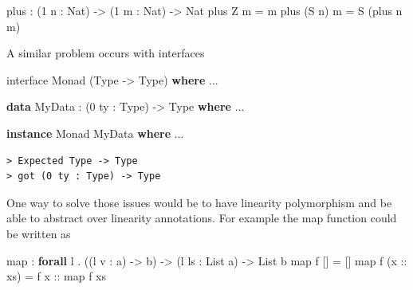 \documentclass[
]{article}
\newenvironment{Shaded}{}{}
\newcommand{\DataTypeTok}[1]{\textcolor[rgb]{0.56,0.13,0.00}{#1}}
\newcommand{\DecValTok}[1]{\textcolor[rgb]{0.25,0.63,0.44}{#1}}
\newcommand{\FunctionTok}[1]{\textcolor[rgb]{0.02,0.16,0.49}{#1}}
\newcommand{\KeywordTok}[1]{\textcolor[rgb]{0.00,0.44,0.13}{\textbf{#1}}}
\newcommand{\NormalTok}[1]{#1}
\newcommand{\OperatorTok}[1]{\textcolor[rgb]{0.40,0.40,0.40}{#1}}
\newcommand{\OtherTok}[1]{\textcolor[rgb]{0.00,0.44,0.13}{#1}}
\begin{document}
\begin{Shaded}
\begin{Highlighting}[]
\NormalTok{plus }\OperatorTok{:}\NormalTok{ (}\DecValTok{1}\NormalTok{ n }\OperatorTok{:} \DataTypeTok{Nat}\NormalTok{) }\OtherTok{{-}\textgreater{}}\NormalTok{ (}\DecValTok{1}\NormalTok{ m }\OperatorTok{:} \DataTypeTok{Nat}\NormalTok{) }\OtherTok{{-}\textgreater{}} \DataTypeTok{Nat}
\NormalTok{plus }\DataTypeTok{Z}\NormalTok{ m }\OtherTok{=}\NormalTok{ m}
\NormalTok{plus (}\DataTypeTok{S}\NormalTok{ n) m }\OtherTok{=} \DataTypeTok{S}\NormalTok{ (plus n m)}
\end{Highlighting}
\end{Shaded}

A similar problem occurs with interfaces

\begin{Shaded}
\begin{Highlighting}[]
\NormalTok{interface }\DataTypeTok{Monad}\NormalTok{ (}\DataTypeTok{Type} \OtherTok{{-}\textgreater{}} \DataTypeTok{Type}\NormalTok{) }\KeywordTok{where}
    \OperatorTok{...}

\KeywordTok{data} \DataTypeTok{MyData} \OperatorTok{:}\NormalTok{ (}\DecValTok{0}\NormalTok{ ty }\OperatorTok{:} \DataTypeTok{Type}\NormalTok{) }\OtherTok{{-}\textgreater{}} \DataTypeTok{Type} \KeywordTok{where}
    \OperatorTok{...}

\KeywordTok{instance} \DataTypeTok{Monad} \DataTypeTok{MyData} \KeywordTok{where}
    \OperatorTok{...}
\end{Highlighting}
\end{Shaded}

\begin{verbatim}
> Expected Type -> Type
> got (0 ty : Type) -> Type
\end{verbatim}

One way to solve those issues would be to have linearity polymorphism
and be able to abstract over linearity annotations. For example the map
function could be written as

\begin{Shaded}
\begin{Highlighting}[]
\FunctionTok{map} \OperatorTok{:} \KeywordTok{forall}\NormalTok{ l }\OperatorTok{.}\NormalTok{ ((l v }\OperatorTok{:}\NormalTok{ a) }\OtherTok{{-}\textgreater{}}\NormalTok{ b) }\OtherTok{{-}\textgreater{}}\NormalTok{ (l ls }\OperatorTok{:} \DataTypeTok{List}\NormalTok{ a) }\OtherTok{{-}\textgreater{}} \DataTypeTok{List}\NormalTok{ b}
\FunctionTok{map}\NormalTok{ f [] }\OtherTok{=}\NormalTok{ []}
\FunctionTok{map}\NormalTok{ f (}\OtherTok{x ::}\NormalTok{ xs) }\OtherTok{=}\NormalTok{ f}\OtherTok{ x ::} \FunctionTok{map}\NormalTok{ f xs}
\end{Highlighting}
\end{Shaded}
\end{document}
